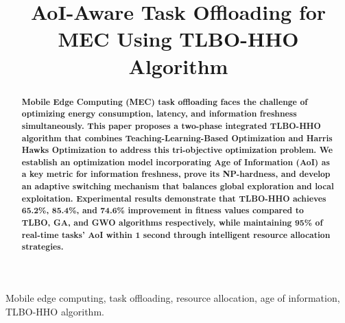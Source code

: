 \documentclass[conference]{IEEEtran}
\begin{document}
\title{AoI-Aware Task Offloading for MEC Using TLBO-HHO Algorithm}

\author{
\and
{}
\and
{}
}

\maketitle

\begin{abstract}
\textbf{Mobile Edge Computing (MEC) task offloading faces the challenge of optimizing energy consumption, latency, and information freshness simultaneously. This paper proposes a two-phase integrated TLBO-HHO algorithm that combines Teaching-Learning-Based Optimization and Harris Hawks Optimization to address this tri-objective optimization problem. We establish an optimization model incorporating Age of Information (AoI) as a key metric for information freshness, prove its NP-hardness, and develop an adaptive switching mechanism that balances global exploration and local exploitation. Experimental results demonstrate that TLBO-HHO achieves 65.2\%, 85.4\%, and 74.6\% improvement in fitness values compared to TLBO, GA, and GWO algorithms respectively, while maintaining 95\% of real-time tasks' AoI within 1 second through intelligent resource allocation strategies.}
\end{abstract}

\begin{IEEEkeywords}
Mobile edge computing, task offloading, resource allocation, age of information, TLBO-HHO algorithm.
\end{IEEEkeywords}
\end{document}

